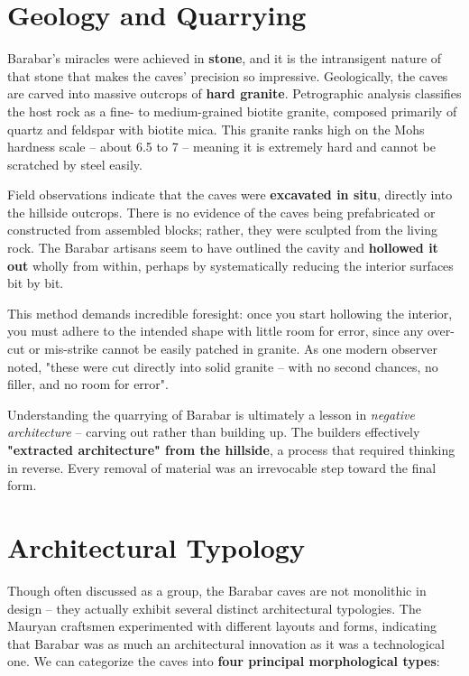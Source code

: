 \documentclass[11pt]{article}
\begin{document}
\section{Geology and Quarrying}

Barabar's miracles were achieved in \textbf{stone}, and it is the intransigent nature of that stone that makes the caves' precision so impressive. Geologically, the caves are carved into massive outcrops of \textbf{hard granite}. Petrographic analysis classifies the host rock as a fine- to medium-grained biotite granite, composed primarily of quartz and feldspar with biotite mica. This granite ranks high on the Mohs hardness scale -- about 6.5 to 7 -- meaning it is extremely hard and cannot be scratched by steel easily.

Field observations indicate that the caves were \textbf{excavated in situ}, directly into the hillside outcrops. There is no evidence of the caves being prefabricated or constructed from assembled blocks; rather, they were sculpted from the living rock. The Barabar artisans seem to have outlined the cavity and \textbf{hollowed it out} wholly from within, perhaps by systematically reducing the interior surfaces bit by bit.

This method demands incredible foresight: once you start hollowing the interior, you must adhere to the intended shape with little room for error, since any over-cut or mis-strike cannot be easily patched in granite. As one modern observer noted, "these were cut directly into solid granite -- with no second chances, no filler, and no room for error".

Understanding the quarrying of Barabar is ultimately a lesson in \textit{negative architecture} -- carving out rather than building up. The builders effectively \textbf{"extracted architecture" from the hillside}, a process that required thinking in reverse. Every removal of material was an irrevocable step toward the final form.

\section{Architectural Typology}

Though often discussed as a group, the Barabar caves are not monolithic in design -- they actually exhibit several distinct architectural typologies. The Mauryan craftsmen experimented with different layouts and forms, indicating that Barabar was as much an architectural innovation as it was a technological one. We can categorize the caves into \textbf{four principal morphological types}:
\end{document}
